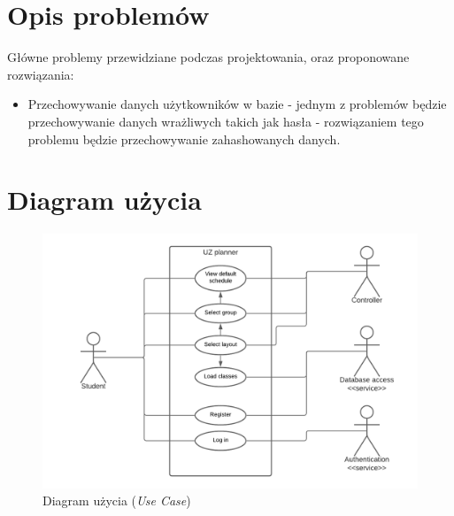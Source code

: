 \documentclass[a4paper,11pt]{uzreport}
\begin{document}
\section{Opis problemów}
	Główne problemy przewidziane podczas projektowania, oraz proponowane rozwiązania:

	\begin{itemize}[leftmargin=0.5in]
            
		\item Przechowywanie danych użytkowników w bazie - jednym z problemów będzie przechowywanie danych wrażliwych takich jak hasła - 			 			rozwiązaniem tego problemu będzie przechowywanie zahashowanych danych.
                
 	\end{itemize}

\section{Diagram użycia}
    \begin{figure}[ht!]
        \centering
        \includegraphics[width=6in]{pictures/use_case.png}
        \caption{Diagram użycia (\textit{Use Case})}
        \label{fig3}
     \end{figure}
\end{document}

